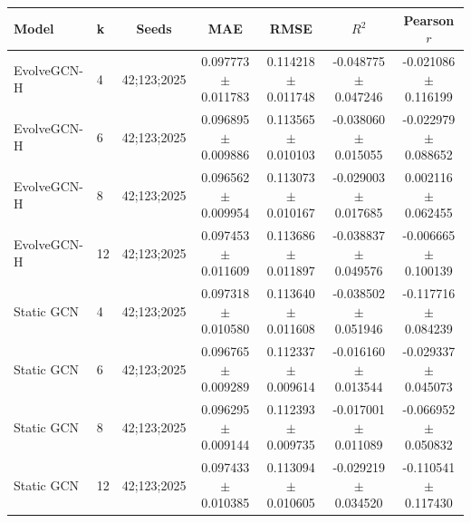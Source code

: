 \begin{tabular}{llccccc}
\hline
Model & k & Seeds & MAE & RMSE & $R^2$ & Pearson $r$ \\
\hline
EvolveGCN-H & 4 & 42;123;2025 & 0.097773 $\pm$ 0.011783 & 0.114218 $\pm$ 0.011748 & -0.048775 $\pm$ 0.047246 & -0.021086 $\pm$ 0.116199 \\
EvolveGCN-H & 6 & 42;123;2025 & 0.096895 $\pm$ 0.009886 & 0.113565 $\pm$ 0.010103 & -0.038060 $\pm$ 0.015055 & -0.022979 $\pm$ 0.088652 \\
EvolveGCN-H & 8 & 42;123;2025 & 0.096562 $\pm$ 0.009954 & 0.113073 $\pm$ 0.010167 & -0.029003 $\pm$ 0.017685 & 0.002116 $\pm$ 0.062455 \\
EvolveGCN-H & 12 & 42;123;2025 & 0.097453 $\pm$ 0.011609 & 0.113686 $\pm$ 0.011897 & -0.038837 $\pm$ 0.049576 & -0.006665 $\pm$ 0.100139 \\
Static GCN & 4 & 42;123;2025 & 0.097318 $\pm$ 0.010580 & 0.113640 $\pm$ 0.011608 & -0.038502 $\pm$ 0.051946 & -0.117716 $\pm$ 0.084239 \\
Static GCN & 6 & 42;123;2025 & 0.096765 $\pm$ 0.009289 & 0.112337 $\pm$ 0.009614 & -0.016160 $\pm$ 0.013544 & -0.029337 $\pm$ 0.045073 \\
Static GCN & 8 & 42;123;2025 & 0.096295 $\pm$ 0.009144 & 0.112393 $\pm$ 0.009735 & -0.017001 $\pm$ 0.011089 & -0.066952 $\pm$ 0.050832 \\
Static GCN & 12 & 42;123;2025 & 0.097433 $\pm$ 0.010385 & 0.113094 $\pm$ 0.010605 & -0.029219 $\pm$ 0.034520 & -0.110541 $\pm$ 0.117430 \\
\hline
\end{tabular}
